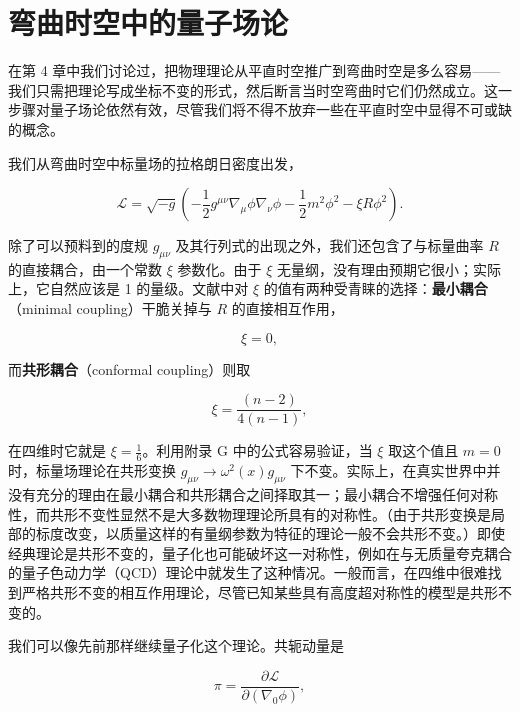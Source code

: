 \section{弯曲时空中的量子场论}

在第 4 章中我们讨论过，把物理理论从平直时空推广到弯曲时空是多么容易——我们只需把理论写成坐标不变的形式，然后断言当时空弯曲时它们仍然成立。这一步骤对量子场论依然有效，尽管我们将不得不放弃一些在平直时空中显得不可或缺的概念。

我们从弯曲时空中标量场的拉格朗日密度出发，

\begin{equation*}
\mathcal{L} = \sqrt{-g}\left(-\frac{1}{2}g^{\mu\nu}\nabla_{\mu}\phi\nabla_{\nu}\phi - \frac{1}{2}m^2\phi^2 - \xi R\phi^2\right).
\tag{9.87}
\end{equation*}

除了可以预料到的度规 $g_{\mu\nu}$ 及其行列式的出现之外，我们还包含了与标量曲率 $R$ 的直接耦合，由一个常数 $\xi$ 参数化。由于 $\xi$ 无量纲，没有理由预期它很小；实际上，它自然应该是 1 的量级。文献中对 $\xi$ 的值有两种受青睐的选择：\textbf{最小耦合}（minimal coupling）干脆关掉与 $R$ 的直接相互作用，

\begin{equation*}
\xi = 0,
\tag{9.88}
\end{equation*}

而\textbf{共形耦合}（conformal coupling）则取

\begin{equation*}
\xi = \frac{(n-2)}{4(n-1)},
\tag{9.89}
\end{equation*}

在四维时它就是 $\xi = \frac{1}{6}$。利用附录 G 中的公式容易验证，当 $\xi$ 取这个值且 $m=0$ 时，标量场理论在共形变换 $g_{\mu\nu}\to\omega^2(x)g_{\mu\nu}$ 下不变。实际上，在真实世界中并没有充分的理由在最小耦合和共形耦合之间择取其一；最小耦合不增强任何对称性，而共形不变性显然不是大多数物理理论所具有的对称性。（由于共形变换是局部的标度改变，以质量这样的有量纲参数为特征的理论一般不会共形不变。）即使经典理论是共形不变的，量子化也可能破坏这一对称性，例如在与无质量夸克耦合的量子色动力学（QCD）理论中就发生了这种情况。一般而言，在四维中很难找到严格共形不变的相互作用理论，尽管已知某些具有高度超对称性的模型是共形不变的。

我们可以像先前那样继续量子化这个理论。共轭动量是

\begin{equation*}
\pi = \frac{\partial\mathcal{L}}{\partial(\nabla_0\phi)},
\tag{9.90}
\end{equation*}

